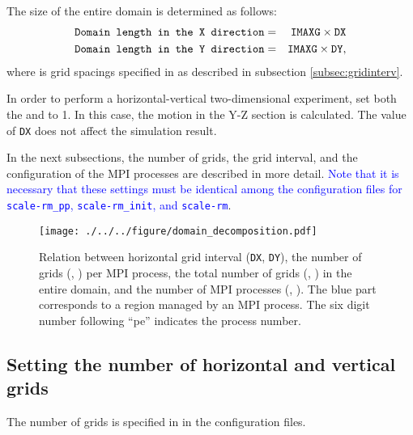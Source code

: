 The size of the entire domain is determined as follows:
\begin{eqnarray}
 \verb|Domain length in the X direction| &=& \nmitemeq{IMAXG} \times \nmitemeq{DX}\\
 \verb|Domain length in the Y direction| &=& \nmitemeq{IMAXG} \times \nmitemeq{DY},
\end{eqnarray}
where  is grid spacings specified in  as described in subsection \ref{subsec:gridinterv}.


In order to perform a horizontal-vertical two-dimensional experiment, set both the  and  to 1.
In this case, the motion in the Y-Z section is calculated.
The value of \texttt{DX} does not affect the simulation result.

In the next subsections, the number of grids, the grid interval, and the configuration of the MPI processes are described in more detail.
\textcolor{blue}{Note that it is necessary that these settings must be identical among the configuration files for \texttt{scale-rm\_pp},  \texttt{scale-rm\_init}, and \texttt{scale-rm}}.

\begin{figure}[h]
\begin{center}
  \texttt{[image: ./../../figure/domain\_decomposition.pdf]}\\
  \caption{Relation between horizontal grid interval (\texttt{DX}, \texttt{DY}),
   the number of grids (, ) per MPI process,
   the total number of grids (, ) in the entire domain,
   and the number of MPI processes (, ).
   The blue part corresponds to a region managed by an MPI process.
   The six digit number following ``pe'' indicates the process number.}
  \label{fig:domain}
\end{center}
\end{figure}

\subsection{Setting the number of horizontal and vertical grids} \label{subsec:relation_dom_reso3}

The number of grids is specified in  in the configuration files.

